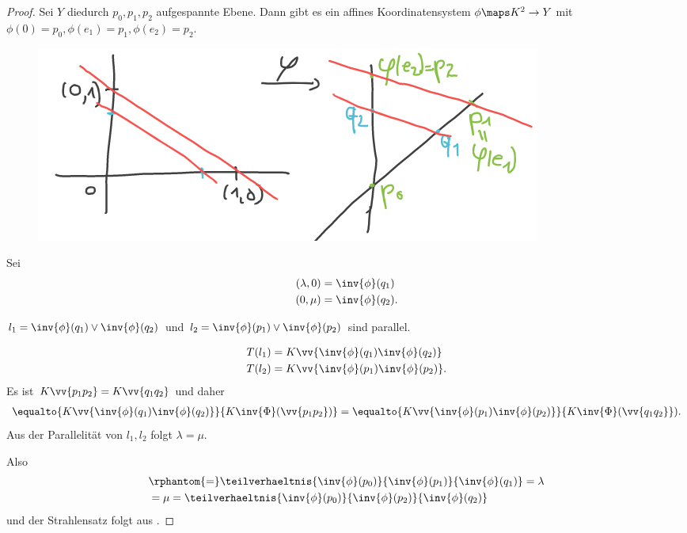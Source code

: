 \begin{proof}
    Sei \( Y \) diedurch \( p_0,p_1,p_2 \) aufgespannte Ebene. Dann gibt es ein affines Koordinatensystem \( \phi\maps K^2 \to Y \) mit \( \phi(0)=p_0, \phi(e_1)=p_1, \phi(e_2)=p_2 \).
    \begin{figure}[H]
        \centering
        \includegraphics[width=0.5\linewidth]{figures/strahlensatz_koordinatensystem}
        \label{fig:strahlensatz_koordinatensystem}
    \end{figure}
    Sei
    \begin{align*}
        (\lambda,0)&=\inv{\phi}(q_1)\\
        (0,\mu)&=\inv{\phi}(q_2).
    \end{align*}    
    \begin{behauptung*}
        \( l_1=\inv{\phi}(q_1)\vee \inv{\phi}(q_2) \) und \( l_2=\inv{\phi}(p_1)\vee \inv{\phi}(p_2) \) sind parallel.
    \end{behauptung*}
    \begin{align*}
        T(l_1)&=K\vv{\inv{\phi}(q_1) \inv{\phi}(q_2)}\\
        T(l_2)&=K\vv{\inv{\phi}(p_1) \inv{\phi}(p_2)}.
    \end{align*}
    Es ist \( K\vv{p_1 p_2}=K\vv{q_1 q_2} \) und daher
    \begin{align*}
        \equalto{K\vv{\inv{\phi}(q_1) \inv{\phi}(q_2)}}{K \inv{\Phi}(\vv{p_1 p_2})}=\equalto{K\vv{\inv{\phi}(p_1) \inv{\phi}(p_2)}}{K\inv{\Phi}(\vv{q_1 q_2}}).
    \end{align*}
    Aus der Parallelität von \( l_1,l_2 \) folgt \( \lambda=\mu \).

    Also
    \begin{align*}
        &\rphantom{=}\teilverhaeltnis{\inv{\phi}(p_0)}{\inv{\phi}(p_1)}{\inv{\phi}(q_1)}=\lambda\\
        &=\mu=\teilverhaeltnis{\inv{\phi}(p_0)}{\inv{\phi}(p_2)}{\inv{\phi}(q_2)}
    \end{align*}
    und der Strahlensatz folgt aus .
\end{proof}
